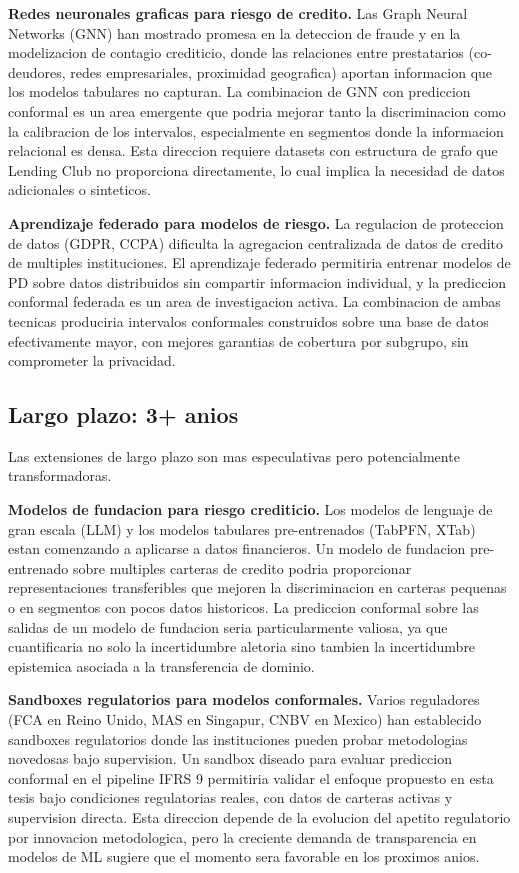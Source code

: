 \documentclass[
  spanish,
  11pt,
  letterpaper,
]{scrbook}
\theoremstyle{plain}
\theoremstyle{remark}
\begin{document}
\textbf{Redes neuronales graficas para riesgo de credito.} Las Graph
Neural Networks (GNN) han mostrado promesa en la deteccion de fraude y
en la modelizacion de contagio crediticio, donde las relaciones entre
prestatarios (co-deudores, redes empresariales, proximidad geografica)
aportan informacion que los modelos tabulares no capturan. La
combinacion de GNN con prediccion conformal es un area emergente que
podria mejorar tanto la discriminacion como la calibracion de los
intervalos, especialmente en segmentos donde la informacion relacional
es densa. Esta direccion requiere datasets con estructura de grafo que
Lending Club no proporciona directamente, lo cual implica la necesidad
de datos adicionales o sinteticos.

\textbf{Aprendizaje federado para modelos de riesgo.} La regulacion de
proteccion de datos (GDPR, CCPA) dificulta la agregacion centralizada de
datos de credito de multiples instituciones. El aprendizaje federado
permitiria entrenar modelos de PD sobre datos distribuidos sin compartir
informacion individual, y la prediccion conformal federada es un area de
investigacion activa. La combinacion de ambas tecnicas produciria
intervalos conformales construidos sobre una base de datos efectivamente
mayor, con mejores garantias de cobertura por subgrupo, sin comprometer
la privacidad.

\subsection{Largo plazo: 3+ anios}\label{sec-future-long}

Las extensiones de largo plazo son mas especulativas pero potencialmente
transformadoras.

\textbf{Modelos de fundacion para riesgo crediticio.} Los modelos de
lenguaje de gran escala (LLM) y los modelos tabulares pre-entrenados
(TabPFN, XTab) estan comenzando a aplicarse a datos financieros. Un
modelo de fundacion pre-entrenado sobre multiples carteras de credito
podria proporcionar representaciones transferibles que mejoren la
discriminacion en carteras pequenas o en segmentos con pocos datos
historicos. La prediccion conformal sobre las salidas de un modelo de
fundacion seria particularmente valiosa, ya que cuantificaria no solo la
incertidumbre aletoria sino tambien la incertidumbre epistemica asociada
a la transferencia de dominio.

\textbf{Sandboxes regulatorios para modelos conformales.} Varios
reguladores (FCA en Reino Unido, MAS en Singapur, CNBV en Mexico) han
establecido sandboxes regulatorios donde las instituciones pueden probar
metodologias novedosas bajo supervision. Un sandbox diseado para evaluar
prediccion conformal en el pipeline IFRS 9 permitiria validar el enfoque
propuesto en esta tesis bajo condiciones regulatorias reales, con datos
de carteras activas y supervision directa. Esta direccion depende de la
evolucion del apetito regulatorio por innovacion metodologica, pero la
creciente demanda de transparencia en modelos de ML sugiere que el
momento sera favorable en los proximos anios.
\end{document}
